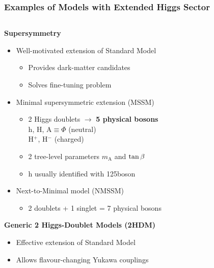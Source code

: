 \documentclass{beamer}
\begin{document}
\begin{frame}
  \frametitle{Examples of Models with Extended Higgs Sector}
  \begin{columns}[T]
    \begin{column}{0.7\textwidth}
      \textbf{Supersymmetry}
      \begin{itemize}
      \item Well-motivated extension of Standard Model
        \begin{itemize}
        \item[\greencheck] Provides dark-matter candidates
        \item[\greencheck] Solves fine-tuning problem
        \end{itemize}
      \item Minimal supersymmetric extension (MSSM)
        \begin{itemize}
        \item 2 Higgs doublets $\rightarrow$ \textbf{5 physical bosons}\\
          \hskip3.1cm h, H, $\text{A}\equiv\Phi$ (neutral)\\
          \hskip3.1cm H$^{+}$, H$^{-}$ (charged)
        \item 2 tree-level parameters $m_{\text{A}}$ and $\tan\beta$
        \item h usually identified with 125\gev boson
        \end{itemize}
      \item Next-to-Minimal model (NMSSM)
        \begin{itemize}
        \item 2 doublets + 1 singlet = 7 physical bosons
        \end{itemize}
      \end{itemize}
      \textbf{Generic 2 Higgs-Doublet Models (2HDM)}
      \begin{itemize}
      \item Effective extension of Standard Model
      \item Allows flavour-changing Yukawa couplings
      \end{itemize}
    \end{column}
    \begin{column}{0.3\textwidth}
      \centering

\end{column}
\end{columns}
\end{frame}
\end{document}
